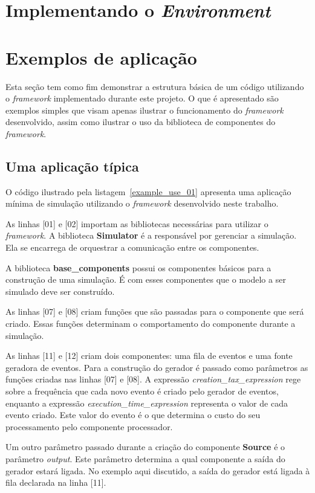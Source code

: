 \section{Implementando o \emph{Environment}}

\section{Exemplos de aplicação}

Esta seção tem como fim demonstrar a estrutura básica de um código utilizando o \textit{framework} implementado durante este projeto. O que é apresentado são exemplos simples que visam apenas ilustrar o funcionamento do \textit{framework} desenvolvido, assim como ilustrar o uso da biblioteca de componentes do \textit{framework}.

\subsection{Uma aplicação típica}

O código ilustrado pela listagem~\ref{example_use_01} apresenta uma aplicação mínima de simulação utilizando o \textit{framework} desenvolvido neste trabalho.

As linhas [01] e [02] importam as bibliotecas necessárias para utilizar o \textit{framework}. A biblioteca \textbf{Simulator} é a responsável por gerenciar a simulação. Ela se encarrega de orquestrar a comunicação entre os componentes.

A biblioteca \textbf{base\_components} possui os componentes básicos para a construção de uma simulação. É com esses componentes que o modelo a ser simulado deve ser construído.


As linhas [07] e [08] criam funções que são passadas para o componente que será criado. Essas funções determinam o comportamento do componente durante a simulação. 

As linhas [11] e [12] criam dois componentes: uma fila de eventos e uma fonte geradora de eventos. Para a construção do gerador é passado como parâmetros as funções criadas nas linhas [07] e [08]. A expressão \textit{creation\_tax\_expression} rege sobre a frequência que cada novo evento é criado pelo gerador de eventos, enquanto a expressão \textit{execution\_time\_expression} representa o valor de cada evento criado. Este valor do evento é o que determina o custo do seu processamento pelo componente processador.

Um outro parâmetro passado durante a criação do componente \textbf{Source} é o parâmetro \textit{output}. Este parâmetro determina a qual componente a saída do gerador estará ligada. No exemplo aqui discutido, a saída do gerador está ligada à fila declarada na linha [11].


